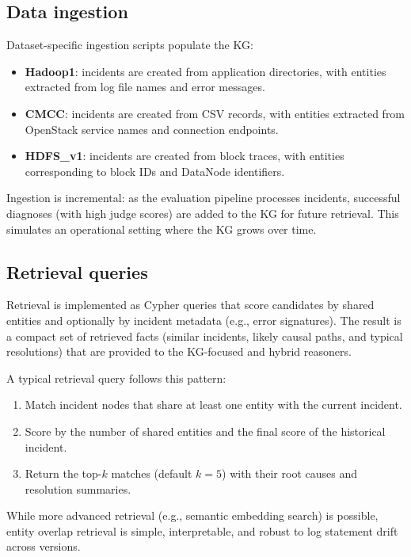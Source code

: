 \subsection{Data ingestion}
Dataset-specific ingestion scripts populate the KG:
\begin{itemize}
  \item \textbf{Hadoop1}: incidents are created from application directories, with entities
        extracted from log file names and error messages.
  \item \textbf{CMCC}: incidents are created from CSV records, with entities extracted from
        OpenStack service names and connection endpoints.
  \item \textbf{HDFS\_v1}: incidents are created from block traces, with entities corresponding
        to block IDs and DataNode identifiers.
\end{itemize}

Ingestion is incremental: as the evaluation pipeline processes incidents, successful diagnoses
(with high judge scores) are added to the KG for future retrieval. This simulates an operational
setting where the KG grows over time.

\subsection{Retrieval queries}
Retrieval is implemented as Cypher queries that score candidates by shared entities and optionally
by incident metadata (e.g., error signatures). The result is a compact set of retrieved facts
(similar incidents, likely causal paths, and typical resolutions) that are provided to the
KG-focused and hybrid reasoners.

A typical retrieval query follows this pattern:
\begin{enumerate}
  \item Match incident nodes that share at least one entity with the current incident.
  \item Score by the number of shared entities and the final score of the historical incident.
  \item Return the top-$k$ matches (default $k=5$) with their root causes and resolution
        summaries.
\end{enumerate}

While more advanced retrieval (e.g., semantic embedding search) is possible, entity overlap
retrieval is simple, interpretable, and robust to log statement drift across versions.

